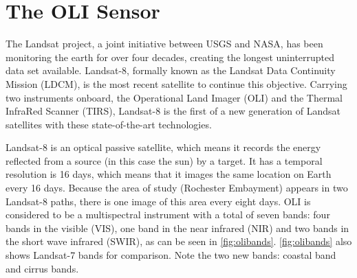 


\section{The OLI Sensor}
The Landsat project, a joint initiative between USGS and NASA, has been monitoring the earth for over four decades, creating the longest uninterrupted data set available. Landsat-8, formally known as the Landsat Data Continuity Mission (LDCM), is the most recent satellite to continue this objective. Carrying two instruments onboard, the Operational Land Imager (OLI) and the Thermal InfraRed Scanner (TIRS), Landsat-8 is the first of a new generation of Landsat satellites with these state-of-the-art technologies. 

Landsat-8 is an optical passive satellite, which means it records the energy reflected from a source (in this case the sun) by a target. It has a temporal resolution is 16 days, which means that it images the same location on Earth every 16 days. Because the area of study (Rochester Embayment) appears in two Landsat-8 paths, there is one image of this area every eight days. OLI is considered to be a multispectral instrument with a total of seven bands: four bands in the visible (VIS), one band in the near infrared (NIR) and two bands in the short wave infrared (SWIR), as can be seen in \autoref{fig:olibands}. \autoref{fig:olibands} also shows Landsat-7 bands for comparison. Note the two new bands: coastal band and cirrus bands.

